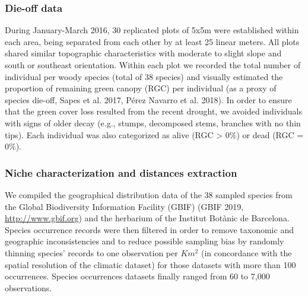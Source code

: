 \documentclass[11pt,twoside]{reedthesis}
\begin{document}
\subsubsection{Die-off data}\label{die-off-data}

During January-March 2016, 30 replicated plots of 5x5m were established
within each area, being separated from each other by at least 25 linear
meters. All plots shared similar topographic characteristics with
moderate to slight slope and south or southeast orientation. Within each
plot we recorded the total number of individual per woody species (total
of 38 species) and visually estimated the proportion of remaining green
canopy (RGC) per individual (as a proxy of species die-off, Sapes et al.
2017, Pérez Navarro et al. 2018). In order to ensure that the green
cover loss resulted from the recent drought, we avoided individuals with
signs of older decay (e.g., stumps, decomposed stems, branches with no
thin tips). Each individual was also categorized as alive (RGC
\textgreater{} 0\%) or dead (RGC = 0\%).\par

\subsubsection{Niche characterization and distances
extraction}\label{niche-characterization-and-distances-extraction}

We compiled the geographical distribution data of the 38 sampled species
from the Global Biodiversity Information Facility (GBIF) (GBIF 2019,
\url{http://www.gbif.org}) and the herbarium of the Institut Botànic de
Barcelona. Species occurrence records were then filtered in order to
remove taxonomic and geographic inconsistencies and to reduce possible
sampling bias by randomly thinning species' records to one observation
per \(Km^2\) (in concordance with the spatial resolution of the climatic
dataset) for those datasets with more than 100 occurrences. Species
occurrences datasets finally ranged from 60 to 7,000 observations.\par
\end{document}
